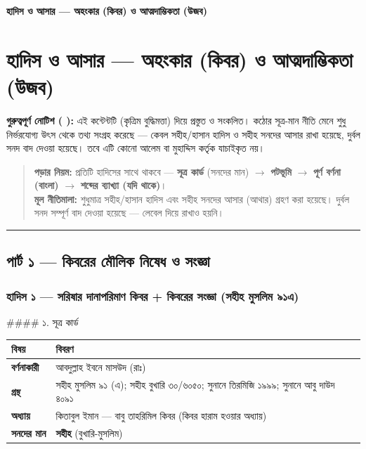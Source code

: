 

\begin{center}{\Large\bfseries\color{emerald} হাদিস ও আসার — অহংকার (কিবর) ও আত্মদাম্ভিকতা (উজব)}\end{center}
\vspace{1em}
\section*{হাদিস ও আসার — অহংকার (কিবর) ও আত্মদাম্ভিকতা (উজব)}

\begin{warnbox}
 \textbf{গুরুত্বপূর্ণ নোটিশ ( ):} এই কন্টেন্টটি  (কৃত্রিম বুদ্ধিমত্তা) দিয়ে প্রস্তুত ও সংকলিত।  কঠোর সূত্র-মান নীতি মেনে শুধু নির্ভরযোগ্য উৎস থেকে তথ্য সংগ্রহ করেছে — কেবল সহীহ/হাসান হাদিস ও সহীহ সনদের আসার রাখা হয়েছে, দুর্বল সনদ বাদ দেওয়া হয়েছে। তবে এটি কোনো আলেম বা মুহাদ্দিস কর্তৃক যাচাইকৃত নয়।
\end{warnbox}


\begin{quote}
\textbf{পড়ার নিয়ম:} প্রতিটি হাদিসের সাথে থাকবে — \textbf{সূত্র কার্ড} (সনদের মান) $\rightarrow$ \textbf{পটভূমি} $\rightarrow$ \textbf{পূর্ণ বর্ণনা (বাংলা)} $\rightarrow$ \textbf{শব্দের ব্যাখ্যা (যদি থাকে)}। \\
\textbf{মূল নীতিমালা:} শুধুমাত্র সহীহ/হাসান হাদিস এবং সহীহ সনদের আসার (আথার) গ্রহণ করা হয়েছে। দুর্বল সনদ সম্পূর্ণ বাদ দেওয়া হয়েছে — লেবেল দিয়ে রাখাও হয়নি।
\end{quote}


\medskip\hrule\medskip

\subsection*{পার্ট ১ — কিবরের মৌলিক নিষেধ ও সংজ্ঞা}

\subsubsection*{হাদিস ১ — সরিষার দানাপরিমাণ কিবর + কিবরের সংজ্ঞা (সহীহ মুসলিম ৯১এ)}

\#\#\#\# ১. সূত্র কার্ড

\begin{table}[h]\centering\small
\begin{tabular}{ll}
বিষয় & বিবরণ \\
\hline
\textbf{বর্ণনাকারী} & আবদুল্লাহ ইবনে মাসউদ (রাঃ) \\
\textbf{গ্রন্থ} & সহীহ মুসলিম ৯১ (এ); সহীহ বুখারি ৩০/৬০৫০; সুনানে তিরমিজি ১৯৯৯; সুনানে আবু দাউদ ৪০৯১ \\
\textbf{অধ্যায়} & কিতাবুল ইমান — বাবু তাহরিমিল কিবর (কিবর হারাম হওয়ার অধ্যায়) \\
\textbf{সনদের মান} & \textbf{সহীহ} (বুখারি-মুসলিম) \\
\hline
\end{tabular}
\end{table}

